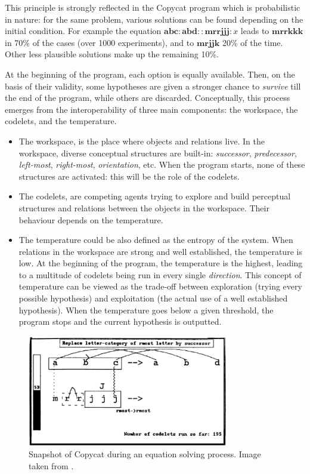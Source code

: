 This principle is strongly reflected in the Copycat program which is
probabilistic in nature: for the same problem, various solutions can be found
depending on the initial condition. For example the  equation $\mathbf{abc} :
\mathbf{abd} :: \mathbf{mrrjjj} : x$ leads to $\mathbf{mrrkkk}$ in 70\% of the
cases (over 1000 experiments), and to $\mathbf{mrjjk}$ 20\% of the time. Other
less plausible solutions make up the remaining 10\%.

At the beginning of the program, each option is equally available.  Then, on
the basis of their validity, some hypotheses are given a stronger chance to
\textit{survive} till the end of the program, while others are discarded.
Conceptually, this process emerges from the interoperability of three main
components: the workspace, the codelets, and the temperature.

\begin{itemize}
    \item The workspace, is the place where objects and relations live.
      In the workspace, diverse conceptual structures are built-in:
      \textit{successor}, \textit{predecessor}, \textit{left-most},
      \textit{right-most}, \textit{orientation}, etc. When the program starts, none of these
      structures are activated: this will be the role of the codelets.
    \item The codelets, are competing agents trying to explore and build
      perceptual structures and relations between the objects in the workspace.
      Their behaviour depends on the temperature.
    \item The temperature could be also defined as the entropy of the
      system. When relations in the workspace are strong and well established,
      the temperature is low. At the beginning of the program, the temperature
      is the highest, leading to a multitude of codelets being run in every
      single \textit{direction}. This concept of temperature can be viewed as
      the trade-off between exploration (trying every possible hypothesis) and
      exploitation (the actual use of a well established hypothesis). When the
      temperature goes below a given threshold, the program stops and the
      current hypothesis is outputted.
\end{itemize}

\begin{figure}[!h]
\centering
  \includegraphics[width=3.5in]{figures/copycat.png}
\caption{Snapshot of Copycat during an equation solving process. Image taken
  from \cite{Mit01}.}
\label{FIG:copycat_snapshot}
\end{figure}


